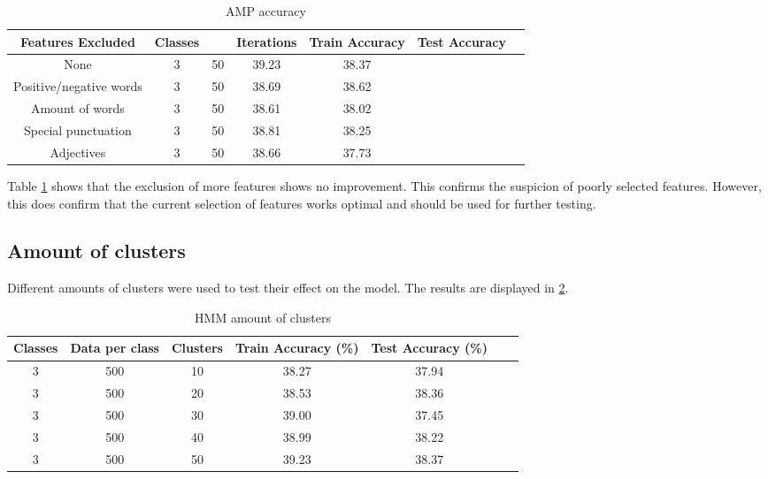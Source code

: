 \begin{table}[h!]
\begin{center}
\begin{tabular}{| c | c | c | c | c | c | c |}
\hline
 {\textbf{Features Excluded}} 	 	& \textbf{Classes}	&		& {\textbf{Iterations}} 
 & {\textbf{Train Accuracy}} 					& {\textbf{Test Accuracy}} 
 \\
\hline
None						&	3	&	50	&	39.23	&	38.37	\\
Positive/negative words	&	3	&	50	&	38.69	&	38.62	\\
Amount of words			&	3	&	50	&	38.61	&	38.02	\\
Special punctuation		&	3	&	50	&	38.81	&	38.25	\\
Adjectives				&	3	&	50	&	38.66	&	37.73	\\
\hline
\end{tabular}
\caption{AMP accuracy}
\label{table:HMMfeatures}
\end{center}
\end{table}

Table \ref{table:HMMfeatures} shows that the exclusion of more features shows no improvement. This confirms the suspicion of poorly selected features. However, this does confirm that the current selection of features works optimal and should be used for further testing.

\subsection*{Amount of clusters}
Different amounts of clusters were used to test their effect on the model. The results are displayed in \ref{table:HMMclusters}.
\begin{table}[h!]
\begin{center}
\begin{tabular}{| c | c | c | c | c | c | c |}
\hline
 {\textbf{Classes}} 	 
 & {\textbf{Data per class}} 					& {\textbf{Clusters}} 
 & {\textbf{Train Accuracy (\%)}} 					& {\textbf{Test Accuracy (\%)}} 
 \\
\hline
3 	 		& 500 		& 10			& 38.27		& 37.94		\\
3 	 		& 500 		& 20			& 38.53		& 38.36		\\
3 	 		& 500 		& 30			& 39.00		& 37.45		\\
3 	 		& 500 		& 40			& 38.99		& 38.22		\\
3 	 		& 500 		& 50			& 39.23		& 38.37		\\
\hline
\end{tabular}
\caption{HMM amount of clusters}
\label{table:HMMclusters}
\end{center}
\end{table}

